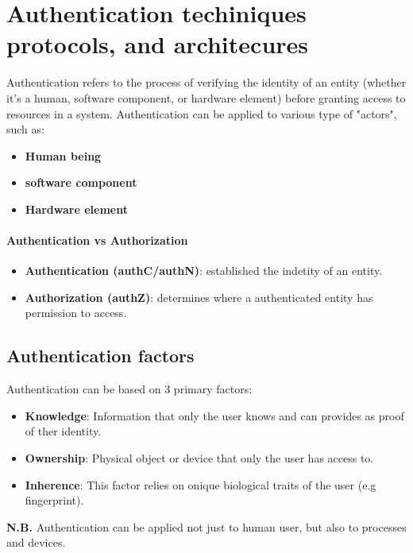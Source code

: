 \chapter{Authentication techiniques protocols, and architecures}

Authentication refers to the process of verifying the identity of an entity (whether it's a human, software component, or hardware element) 
before granting access to resources in a system. Authentication can be applied to various type of "actors", such as:
\begin{itemize}
    \item \textbf{Human being}
    \item \textbf{software component}
    \item \textbf{Hardware element}
\end{itemize}

\subsubsection{Authentication vs Authorization}
\begin{itemize}
    \item \textbf{Authentication (authC/authN)}: established the indetity of an entity.
    \item \textbf{Authorization (authZ)}: determines where a authenticated entity has permission to access.
\end{itemize}

\section{Authentication factors}
Authentication can be based on 3 primary factors:
\begin{itemize}
    \item \textbf{Knowledge}: Information that only the user knows and can provides as proof of ther identity.
    \item \textbf{Ownership}: Physical object or device that only the user has access to.
    \item \textbf{Inherence}: This factor relies on onique biological traits of the user (e.g fingerprint).
\end{itemize}
\textbf{N.B.} Authentication can be applied not just to human user, but also to processes and devices.

